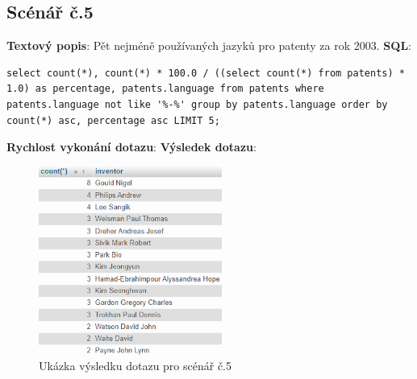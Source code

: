 \subsection{Scénář č.5}
\textbf{Textový popis}: Pět nejméně používaných jazyků pro patenty za rok 2003.
\newline
\textbf{SQL}: 
\begin{lstlisting}[label = {lst:elements_a}]
select count(*), count(*) * 100.0 / ((select count(*) from patents) * 1.0) as percentage, patents.language from patents where patents.language not like '%-%' group by patents.language order by count(*) asc, percentage asc LIMIT 5;
\end{lstlisting}
\textbf{Rychlost vykonání dotazu}: 
\newline
\textbf{Výsledek dotazu}:
\begin{figure}[H]
\centering
\includegraphics[width=6cm]{img/scenare/scenar_9}
\caption{Ukázka výsledku dotazu pro scénář č.5}
\label{fig:scenar5}
\end{figure}

